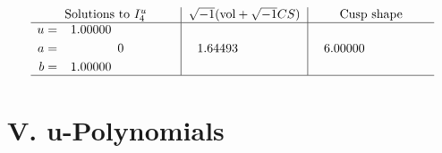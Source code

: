 \documentclass[1p]{elsarticle_modified}
\theoremstyle{definition}
\newcommand{\I}{\sqrt{-1}}
\begin{document}
$$\begin{array}{c|c|c}  
\text{Solutions to }I^u_{4}& \I (\text{vol} + \sqrt{-1}CS) & \text{Cusp shape}\\
 \hline 
\begin{aligned}
u &= \phantom{-}1.00000\phantom{ +0.000000I} \\
a &= \phantom{-0.000000 } 0 \\
b &= \phantom{-}1.00000\phantom{ +0.000000I}\end{aligned}
 & \phantom{-}1.64493\phantom{ +0.000000I} & \phantom{-}6.00000\phantom{ +0.000000I}\\
 \hline 
 \end{array}$$\newpage
\newpage\renewcommand{\arraystretch}{1}
\centering \section*{ V. u-Polynomials}
\end{document}
